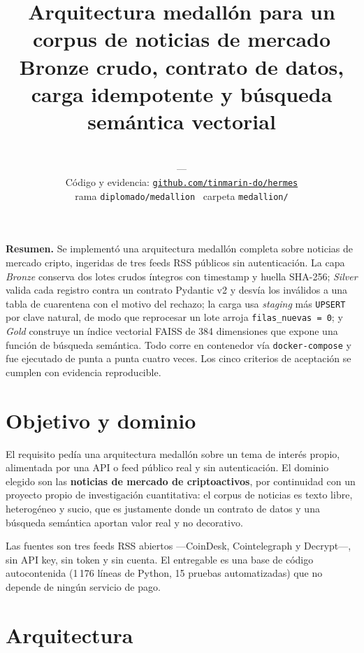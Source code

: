 \documentclass[11pt,a4paper]{article}
\title{\vspace{-1.5cm}\textbf{Arquitectura medallón para un corpus de noticias
de mercado}\\[0.3em]\large Bronze crudo, contrato de datos, carga idempotente
y búsqueda semántica vectorial}
\author{\Autora \\ \small \Materia\ ---\ \Institucion \\[0.5em]
  \small Código y evidencia: \href{\Repo}{\texttt{github.com/\allowbreak tinmarin-do/\allowbreak hermes}} \\
  \footnotesize rama \texttt{diplomado/medallion} \textperiodcentered\ carpeta
  \texttt{medallion/}}
\date{\Fecha}
\begin{document}
\maketitle

\begin{caja}
\textbf{Resumen.} Se implementó una arquitectura medallón completa sobre
noticias de mercado cripto, ingeridas de tres feeds RSS públicos sin
autenticación. La capa \emph{Bronze} conserva dos lotes crudos íntegros con
timestamp y huella SHA-256; \emph{Silver} valida cada registro contra un
contrato Pydantic v2 y desvía los inválidos a una tabla de cuarentena con el
motivo del rechazo; la carga usa \emph{staging} más \texttt{UPSERT} por clave
natural, de modo que reprocesar un lote arroja \texttt{filas\_nuevas = 0}; y
\emph{Gold} construye un índice vectorial FAISS de 384 dimensiones que expone
una función de búsqueda semántica. Todo corre en contenedor vía
\texttt{docker-compose} y fue ejecutado de punta a punta cuatro veces. Los cinco
criterios de aceptación se cumplen con evidencia reproducible.
\end{caja}

\section{Objetivo y dominio}

El requisito pedía una arquitectura medallón sobre un tema de interés propio,
alimentada por una API o feed público real y sin autenticación. El dominio
elegido son las \textbf{noticias de mercado de criptoactivos}, por continuidad
con un proyecto propio de investigación cuantitativa: el corpus de noticias es
texto libre, heterogéneo y sucio, que es justamente donde un contrato de datos y
una búsqueda semántica aportan valor real y no decorativo.

Las fuentes son tres feeds RSS abiertos ---CoinDesk, Cointelegraph y
Decrypt---, sin API key, sin token y sin cuenta. El entregable es una base de
código autocontenida (1\,176 líneas de Python, 15 pruebas automatizadas) que no
depende de ningún servicio de pago.

\section{Arquitectura}
\end{document}
